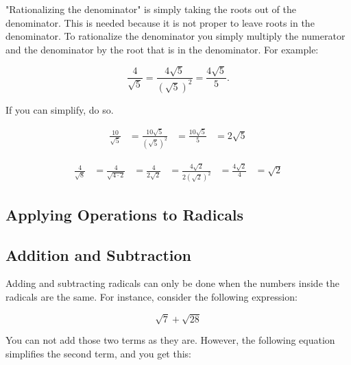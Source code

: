 "Rationalizing the denominator" is simply taking the roots out of the denominator. This is
needed because it is not proper to leave roots in the denominator. To rationalize the
denominator you simply multiply the numerator and the denominator by the root that is in
the denominator. For example:


\[
\frac{4}{\sqrt{5}} = \frac{4\sqrt{5}}{(\sqrt{5})^2} = \frac{4\sqrt{5}}{5}.
\]

If you can simplify, do so.



\begin{align}
\frac{10}{\sqrt{5}} &= \frac{10\sqrt{5}}{(\sqrt{5})^2} &= \frac{10\sqrt{5}}{5} &= 2\sqrt{5}
\end{align}



\begin{align}
\frac{4}{\sqrt{8}} &= \frac{4}{\sqrt{4 \cdot 2}} &= \frac{4}{2\sqrt{2}} &= \frac{4\sqrt{2}}{2(\sqrt{2})^2} &= \frac{4\sqrt{2}}{4} &= \sqrt{2}
\end{align}






\subsection{Applying Operations to Radicals}
\label{sss:appl-92b7}





\subsection{Addition and Subtraction}
\label{sss:addi-546e}




Adding and subtracting radicals can only be done when the numbers inside the radicals are
the same. For instance, consider the following expression:



$${\sqrt{7}+\sqrt{28}}$$



You can not add those two terms as they are. However, the following equation simplifies
the second term, and you get this:



